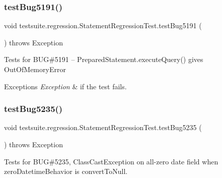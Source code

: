 \subsubsection{\texorpdfstring{test\+Bug5191()}{testBug5191()}}
{\footnotesize\ttfamily void testsuite.\+regression.\+Statement\+Regression\+Test.\+test\+Bug5191 (\begin{DoxyParamCaption}{ }\end{DoxyParamCaption}) throws Exception}

Tests for B\+UG\#5191 -- Prepared\+Statement.\+execute\+Query() gives Out\+Of\+Memory\+Error


\begin{DoxyExceptions}{Exceptions}
{\em Exception} & if the test fails. \\
\hline
\end{DoxyExceptions}
\mbox{\label{classtestsuite_1_1regression_1_1_statement_regression_test_ac43b204c22e7e37fa98b6bd22e3b18fc}} 
\subsubsection{\texorpdfstring{test\+Bug5235()}{testBug5235()}}
{\footnotesize\ttfamily void testsuite.\+regression.\+Statement\+Regression\+Test.\+test\+Bug5235 (\begin{DoxyParamCaption}{ }\end{DoxyParamCaption}) throws Exception}

Tests for B\+UG\#5235, Class\+Cast\+Exception on all-\/zero date field when zero\+Datetime\+Behavior is \textquotesingle{}convert\+To\+Null\textquotesingle{}.


